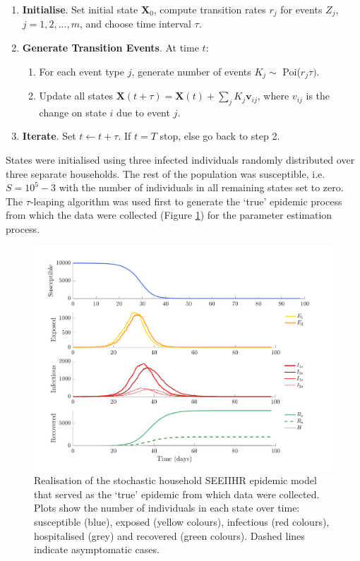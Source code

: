 \begin{enumerate}
	\item \textbf{Initialise}. Set initial state $\mathbf{X}_0$,  compute transition rates $r_j$ for events $Z_j$, $j=1,2,...,m$, and choose time interval $\tau$.
	
	\item \textbf{Generate Transition Events}. At time $t$:
	\begin{enumerate}[]
		\item For each event type $j$, generate number of events $K_j \sim$ Poi($r_j\tau)$.
		\item Update all states $\mathbf{X}(t+\tau) = \mathbf{X}(t) + \sum_j K_j \mathbf{v}_{ij}$, where $v_{ij}$ is the change on state $i$ due to event $j$.
	\end{enumerate}

	\item \textbf{Iterate}. Set $t \leftarrow t + \tau$. If $t=T$ stop, else go back to step 2.
	
\end{enumerate}
\noindent States were initialised using three infected individuals randomly distributed over three separate households. The rest of the population was susceptible, i.e. $S=10^5-3$  with the number of individuals in all remaining states set to zero.\\
The $\tau$-leaping algorithm was used first to generate the `true' epidemic process from which the data were collected (Figure \ref{fig: SEEIIHR trajectories}) for the parameter estimation process.
\begin{figure}[h!]
	\centering
	\includegraphics[scale=0.5]{Figs/SEEIIHRR_trajectories.png}
	\caption{Realisation of the stochastic household SEEIIHR epidemic model that served as the `true' epidemic from which data were collected. Plots show the number of individuals in each state over time: susceptible (blue), exposed (yellow colours), infectious (red colours), hospitalised (grey) and recovered (green colours). Dashed lines indicate asymptomatic cases.}
	\label{fig: SEEIIHR trajectories}
\end{figure}

